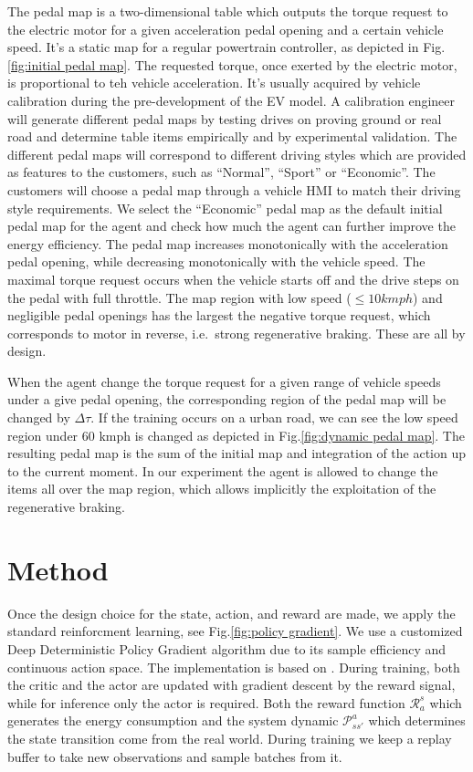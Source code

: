 \documentclass{article}
\begin{document}
The pedal map is a two-dimensional table which outputs the torque request to the electric motor for a given acceleration pedal opening and a certain vehicle speed. It's a static map for a regular powertrain controller, as depicted in Fig.\@\ref{fig:initial pedal map}. The requested torque, once exerted by the electric motor, is proportional to teh vehicle acceleration. It's usually acquired by vehicle calibration during the pre-development of the EV model. A calibration engineer will generate different pedal maps by testing drives on proving ground or real road and determine table items empirically and by experimental validation. The different pedal maps will correspond to different driving styles which are provided as features to the customers, such as ``Normal'', ``Sport'' or ``Economic''. The customers will choose a pedal map through a vehicle HMI to match their driving style requirements. We select the ``Economic'' pedal map as the default initial pedal map for the agent and check how much the agent can further improve the energy efficiency. The pedal map increases monotonically with the acceleration pedal opening, while decreasing monotonically with the vehicle speed. The maximal torque request occurs when the vehicle starts off and the drive steps on the pedal with full throttle. The map region with low speed ($\leq10kmph$) and negligible pedal openings has the largest the negative torque request, which corresponds to motor in reverse, i.e.\ strong regenerative braking. These are all by design.

When the agent change the torque request for a given range of vehicle speeds under a give pedal opening, the corresponding region of the pedal map will be changed by $\Delta\tau$. If the training occurs on a urban road, we can see the low speed region under 60 kmph is changed as depicted in Fig.\ref{fig:dynamic pedal map}. The resulting pedal map is the sum of the initial map and integration of the action up to the current moment. In our experiment the agent is allowed to change the items all over the map region, which allows implicitly the exploitation of the regenerative braking.

\section{Method}\label{sec:method}

Once the design choice for the state, action, and reward are made, we apply the standard reinforcment learning, see Fig.\@\ref{fig:policy gradient}. We use a customized Deep Deterministic Policy Gradient algorithm \parencite{lillicrap15:_contin} due to its sample efficiency and continuous action space. The implementation is based on \parencite{keras20:DDPG}. During training, both the critic and the actor are updated with gradient descent by the reward signal, while for inference only the actor is required. Both the reward function $\mathcal{R}_a^s$ which generates the energy consumption and the system dynamic $\mathcal{P}_{ss'}^{a}$ which determines the state transition come from the real world. During training we keep a replay buffer to take new observations and sample batches from it.
\end{document}
